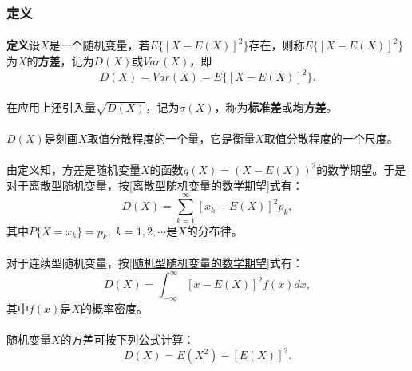 \subsubsection{定义}
\paragraph{}
\textbf{定义\;}设$X$是一个随机变量，若$E\{[X-E(X)]^2\}$存在，则称$E\{[X-E(X)]^2\}$为$X$的\textbf{方差}，记为$D(X)$或$Var(X)$，即
\begin{equation}
  D(X)=Var(X)=E\{[X-E(X)]^2\}.
\end{equation}

\paragraph{}
在应用上还引入量$\sqrt{D(X)}$，记为$\sigma(X)$，称为\textbf{标准差}或\textbf{均方差}。

\paragraph{}
$D(X)$是刻画$X$取值分散程度的一个量，它是衡量$X$取值分散程度的一个尺度。

\paragraph{}
由定义知，方差是随机变量$X$的函数$g(X)=(X-E(X))^2$的数学期望。于是对于离散型随机变量，按\eqref{离散型随机变量的数学期望}式有：
\begin{equation}
  D(X) = \sum_{k=1}^\infty[x_k - E(X)]^2p_k,
\end{equation}
其中$P\{X=x_k\}=p_k,\;k=1,2,\cdots$是$X$的分布律。

\paragraph{}
对于连续型随机变量，按\eqref{随机型随机变量的数学期望}式有：
\begin{equation}
  D(X) = \int_{-\infty}^\infty [x - E(X)]^2f(x)dx,
\end{equation}
其中$f(x)$是$X$的概率密度。

\paragraph{}
随机变量$X$的方差可按下列公式计算：
\begin{equation}
  D(X)=E(X^2)-[E(X)]^2.
\end{equation}

